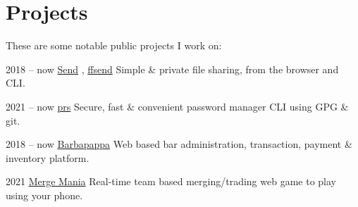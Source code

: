 \documentclass[]{cv-timvisee}
\begin{document}

\section{Projects}

These are some notable public projects I work on:

\begin{entrylist}

\entry
{2018 -- now}
{\href{https://github.com/timvisee/send}{Send} , \href{https://github.com/timvisee/ffsend}{ffsend}}
{}
{Simple \& private file sharing, from the browser and CLI.}

\entry
{2021 -- now}
{\href{https://github.com/timvisee/prs}{prs}}
{}
{Secure, fast \& convenient password manager CLI using GPG \& git.}

\entry
{2018 -- now}
{\href{https://github.com/timvisee/barbapappa}{Barbapappa}}
{}
{Web based bar administration, transaction, payment \& inventory platform.}

\entry
{2021}
{\href{https://github.com/timvisee/merge-mania}{Merge Mania}}
{}
{Real-time team based merging/trading web game to play using your phone.}







\end{entrylist}
\end{document}
